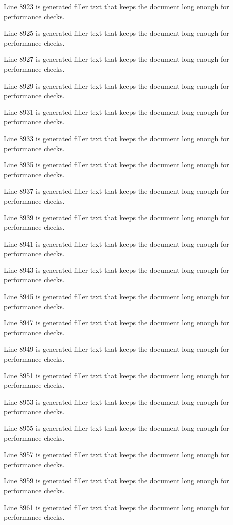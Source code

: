 Line 8923 is generated filler text that keeps the document long enough for performance checks.

Line 8925 is generated filler text that keeps the document long enough for performance checks.

Line 8927 is generated filler text that keeps the document long enough for performance checks.

Line 8929 is generated filler text that keeps the document long enough for performance checks.

Line 8931 is generated filler text that keeps the document long enough for performance checks.

Line 8933 is generated filler text that keeps the document long enough for performance checks.

Line 8935 is generated filler text that keeps the document long enough for performance checks.

Line 8937 is generated filler text that keeps the document long enough for performance checks.

Line 8939 is generated filler text that keeps the document long enough for performance checks.

Line 8941 is generated filler text that keeps the document long enough for performance checks.

Line 8943 is generated filler text that keeps the document long enough for performance checks.

Line 8945 is generated filler text that keeps the document long enough for performance checks.

Line 8947 is generated filler text that keeps the document long enough for performance checks.

Line 8949 is generated filler text that keeps the document long enough for performance checks.

Line 8951 is generated filler text that keeps the document long enough for performance checks.

Line 8953 is generated filler text that keeps the document long enough for performance checks.

Line 8955 is generated filler text that keeps the document long enough for performance checks.

Line 8957 is generated filler text that keeps the document long enough for performance checks.

Line 8959 is generated filler text that keeps the document long enough for performance checks.

Line 8961 is generated filler text that keeps the document long enough for performance checks.

